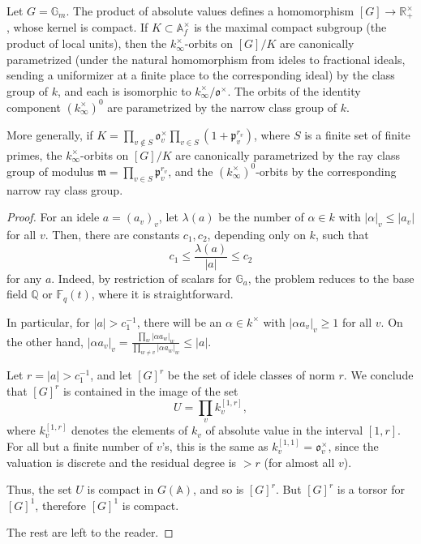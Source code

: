 \begin{proposition}
\label{proposition-automorphic-Gm}
 Let $G=\mathbb G_m$. The product of absolute values defines a homomorphism $[G]\to \mathbb R^\times_+$, whose kernel is compact. If $K\subset \mathbb A_f^\times$ is the maximal compact subgroup (the product of local units), then the $k_\infty^\times$-orbits on $[G]/K$ are canonically parametrized (under the natural homomorphism from ideles to fractional ideals, sending a uniformizer at a finite place to the corresponding ideal) by the class group of $k$, and each is isomorphic to $k_\infty^\times / \mathfrak o^\times$. The orbits of the identity component $(k_\infty^\times)^0$ are parametrized by the narrow class group of $k$.
 
 More generally, if $K = \prod_{v\notin S} \mathfrak o_v^\times \prod_{v\in S} (1+\mathfrak p_v^{r_v})$, where $S$ is a finite set of finite primes, the $k_\infty^\times$-orbits on $[G]/K$ are canonically parametrized by the ray class group of modulus $\mathfrak m = \prod_{v\in S} \mathfrak p_v^{r_v}$, and the $(k_\infty^\times)^0$-orbits by the corresponding narrow ray class group.
\end{proposition}

\begin{proof}
 For an idele $a = (a_v)_v$, let $\lambda(a)$ be the number of $\alpha\in k$ with $|\alpha|_v\le  |a_v|$ for all $v$. Then, there are constants $c_1, c_2$, depending only on $k$, such that 
 $$ c_1 \le \frac{\lambda(a)}{|a|} \le c_2$$
 for any $a$. Indeed, by restriction of scalars for $\mathbb G_a$, the problem reduces to the base field $\mathbb Q$ or $\mathbb F_q(t)$, where it is straightforward.
 
 In particular, for $|a| > c_1^{-1}$, there will be an $\alpha\in k^\times$ with $|\alpha a_v|_v \ge 1$ for all $v$. On the other hand, $|\alpha a_v|_v = \frac{\prod_w |\alpha a_w|_w}{\prod_{w\ne v} |\alpha a_w|_w} \le |a|$. 
 
 Let $r = |a| > c_1^{-1}$, and let $[G]^r$ be the set of idele classes of norm $r$. We conclude that $[G]^r$ is contained in the image of the set
 $$ U=\prod_v k_v^{[1,r]},$$
 where $k_v^{[1,r]}$ denotes the elements of $k_v$ of absolute value in the interval $[1,r]$. For all but a finite number of $v$'s, this is the same as $k_v^{[1,1]}=\mathfrak o_v^\times$, since the valuation is discrete and the residual degree is $> r$ (for almost all $v$).
 
 Thus, the set $U$ is compact in $G(\mathbb A)$, and so is $[G]^r$. But $[G]^r$ is a torsor for $[G]^1$, therefore $[G]^1$ is compact.
 
 The rest are left to the reader.
\end{proof}


